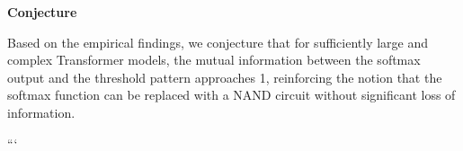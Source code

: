 \documentclass[11pt]{article}
\theoremstyle{definition}
\begin{document}
\textbf{Conjecture}













Based on the empirical findings, we conjecture that for sufficiently large and complex Transformer models, the mutual information between the softmax output and the threshold pattern approaches 1, reinforcing the notion that the softmax function can be replaced with a NAND circuit without significant loss of information.



































































```
\end{document}

